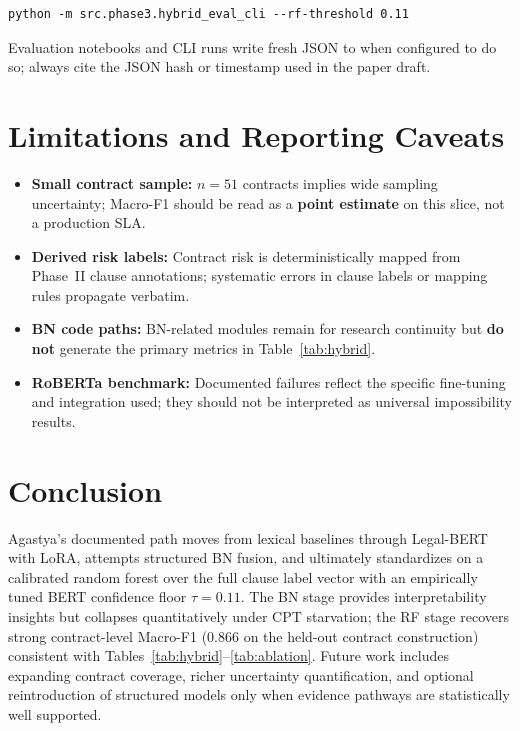 \documentclass[conference,twocolumn]{IEEEtran}
\DeclareRobustCommand{\filepath}[1]{\path{#1}}
\begin{document}
\begin{lstlisting}
python -m src.phase3.hybrid_eval_cli --rf-threshold 0.11
\end{lstlisting}

Evaluation notebooks and CLI runs write fresh JSON to \filepath{reports/phase3/hybrid_eval.json} when configured to do so; always cite the JSON hash or timestamp used in the paper draft.

\section{Limitations and Reporting Caveats}
\label{sec:limits}

\begin{itemize}
  \item \textbf{Small contract sample:} $n=51$ contracts implies wide sampling uncertainty; Macro-F1 should be read as a \textbf{point estimate} on this slice, not a production SLA.
  \item \textbf{Derived risk labels:} Contract risk is deterministically mapped from Phase~II clause annotations; systematic errors in clause labels or mapping rules propagate verbatim.
  \item \textbf{BN code paths:} BN-related modules remain for research continuity but \textbf{do not} generate the primary metrics in Table~\ref{tab:hybrid}.
  \item \textbf{RoBERTa benchmark:} Documented failures reflect the specific fine-tuning and integration used; they should not be interpreted as universal impossibility results.
\end{itemize}

\section{Conclusion}
\label{sec:conc}

Agastya's documented path moves from lexical baselines through Legal-BERT with LoRA, attempts structured BN fusion, and ultimately standardizes on a calibrated random forest over the full clause label vector with an empirically tuned BERT confidence floor $\tau=0.11$. The BN stage provides interpretability insights but collapses quantitatively under CPT starvation; the RF stage recovers strong contract-level Macro-F1 ($0.866$ on the held-out contract construction) consistent with Tables~\ref{tab:hybrid}--\ref{tab:ablation}. Future work includes expanding contract coverage, richer uncertainty quantification, and optional reintroduction of structured models only when evidence pathways are statistically well supported.
\end{document}

